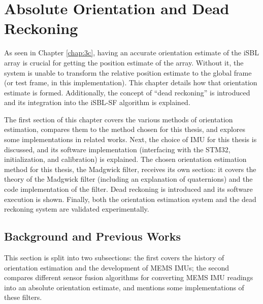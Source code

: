 \documentclass[11pt]{ucthesisCP}
\begin{document}




\chapter{Absolute Orientation and Dead Reckoning} \label{chap:4c}
As seen in Chapter \ref{chap:3c}, having an accurate orientation estimate of the iSBL array is crucial for getting the position estimate of the array. Without it, the system is unable to transform the relative position estimate to the global frame (or test frame, in this implementation). This chapter details how that orientation estimate is formed. Additionally, the concept of “dead reckoning” is introduced and its integration into the iSBL-SF algorithm is explained.

The first section of this chapter covers the various methods of orientation estimation, compares them to the method chosen for this thesis, and explores some implementations in related works. Next, the choice of IMU for this thesis is discussed, and its software implementation (interfacing with the STM32, initialization, and calibration) is explained. The chosen orientation estimation method for this thesis, the Madgwick filter, receives its own section: it covers the theory of the Madgwick filter (including an explanation of quaternions) and the code implementation of the filter. Dead reckoning is introduced and its software execution is shown. Finally, both the orientation estimation system and the dead reckoning system are validated experimentally.

\section{Background and Previous Works} \label{sec:4s1}
This section is split into two subsections: the first covers the history of orientation estimation and the development of MEMS IMUs; the second compares different sensor fusion algorithms for converting MEMS IMU readings into an absolute orientation estimate, and mentions some implementations of these filters.
\end{document}
